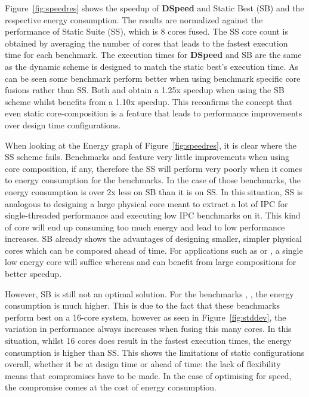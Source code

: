 Figure~\ref{fig:speedres} shows the speedup of \textbf{DSpeed} and Static Best (SB) and the respective energy consumption.
The results are normalized against the performance of Static Suite (SS), which is 8 cores fused.
The SS core count is obtained by averaging the number of cores that leads to the fastest execution time for each benchmark.
The execution times for \textbf{DSpeed} and SB are the same as the dynamic scheme is designed to match the static best's execution time.
As can be seen some benchmark perform better when using benchmark specific core fusions rather than SS.
Both  and  obtain a 1.25x speedup when using the SB scheme whilst  benefits from a 1.10x speedup.
This reconfirms the concept that even static core-composition is a feature that leads to performance improvements over design time configurations.

When looking at the Energy graph of Figure~\ref{fig:speedres}, it is clear where the SS scheme fails.
Benchmarks  and  feature very little improvements when using core composition, if any, therefore the SS will perform very poorly when it comes to energy consumption for the benchmarks.
In the case of those benchmarks, the energy consumption is over 2x less on SB than it is on SS.
In this situation, SS is analogous to designing a large physical core meant to extract a lot of IPC for single-threaded performance and executing low IPC benchmarks on it.
This kind of core will end up consuming too much energy and lead to low performance increases.
SB already shows the advantages of designing smaller, simpler physical cores which can be composed ahead of time.
For applications such as  or , a single low energy core will suffice whereas  and  can benefit from large compositions for better speedup.

However, SB is still not an optimal solution. 
For the benchmarks , ,  the energy consumption is much higher.
This is due to the fact that these benchmarks perform best on a 16-core system, however as seen in Figure~\ref{fig:stddev}, the variation in performance always increases when fusing this many cores.
In this situation, whilst 16 cores does result in the fastest execution times, the energy consumption is higher than SS.
This shows the limitations of static configurations overall, whether it be at design time or ahead of time: the lack of flexibility means that compromises have to be made.
In the case of optimising for speed, the compromise comes at the cost of energy consumption.

